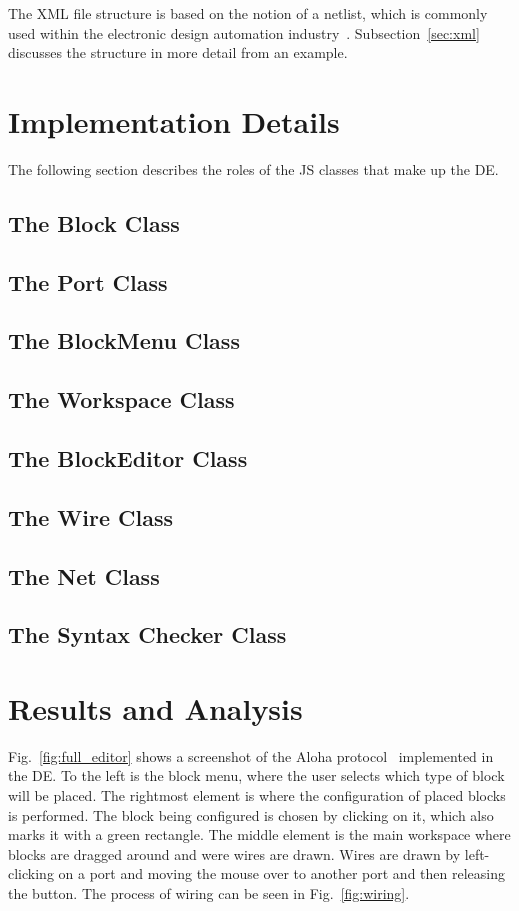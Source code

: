 \documentclass[journal,comsoc]{IEEEtran}
\begin{document}
The XML file structure is based on the notion of a netlist, which is commonly used within the
electronic design automation industry~\cite{netlist}. Subsection~\ref{sec:xml} discusses the
structure in more detail from an example.

\section{Implementation Details}
\label{sec:details}
The following section describes the roles of the JS classes that make up the DE.
\subsection{The Block Class}
\subsection{The Port Class}
\subsection{The BlockMenu Class}
\subsection{The Workspace Class}
\subsection{The BlockEditor Class}
\subsection{The Wire Class}
\subsection{The Net Class}
\subsection{The Syntax Checker Class}

\section{Results and Analysis}
Fig.~\ref{fig:full_editor} shows a screenshot of the Aloha protocol~\cite{aloha} implemented
in the DE. To the left is the block menu, where the user selects which type of block will be
placed. The rightmost element is where the configuration of placed blocks is performed. The
block being configured is chosen by clicking on it, which also marks it with a green rectangle.
The middle element is the main workspace where blocks are dragged around and were wires are
drawn. Wires are drawn by left-clicking on a port and moving the mouse over to another port and
then releasing the button. The process of wiring can be seen in Fig.~\ref{fig:wiring}.
\end{document}
